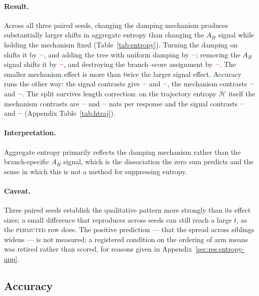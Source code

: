 \documentclass[11pt]{article}
\newcommand{\Htraj}{\mathcal{H}}
\newcommand{\AH}{A_{H}}
\providecommand{\PENDING}{\textcolor{red}{\textbf{--}}}
\newcommand{\num}[1]{\ifcsname #1\endcsname\csname #1\endcsname\else\PENDING\fi}
\begin{document}
\paragraph{Result.} Across all three paired seeds, changing the damping mechanism
produces substantially larger shifts in aggregate entropy than changing the $\AH$
signal while holding the mechanism fixed (Table~\ref{tab:entropy}). Turning the
damping on shifts it by $\num{Csteergrpoentropy}$, and adding the tree with uniform
damping by $\num{Cuniformsteerentropy}$; removing the $\AH$ signal shifts it by
$\num{Csigneduniformentropy}$, and destroying the branch--score assignment by
$\num{Csignedpermutedentropy}$. The smaller mechanism effect is more than twice the
larger signal effect. Accuracy runs the other way: the signal contrasts give
$\num{Csigneduniformacc}$ and $\num{Csignedpermutedacc}$, the mechanism contrasts
$\num{Csteergrpoacc}$ and $\num{Cuniformsteeracc}$. The split survives length
correction: on the trajectory entropy $\Htraj$ itself the mechanism contrasts are
$\num{Csteergrpohtraj}$ and $\num{Cuniformsteerhtraj}$ nats per response and the
signal contrasts $\num{Csigneduniformhtraj}$ and $\num{Csignedpermutedhtraj}$
(Appendix Table~\ref{tab:htraj}).

\paragraph{Interpretation.} Aggregate entropy primarily reflects the damping mechanism
rather than the branch-specific $\AH$ signal, which is the dissociation the zero sum
predicts and the sense in which this is not a method for suppressing entropy.

\paragraph{Caveat.} Three paired seeds establish the qualitative pattern more strongly
than its effect sizes; a small difference that reproduces across seeds can still reach
a large $t$, as the \textsc{permuted} row does. The positive prediction --- that the
spread across siblings widens --- is not measured; a registered condition on the ordering of arm means was
retired rather than scored, for reasons given in Appendix~\ref{sec:res:entropy-app}.

\subsection{Accuracy}
\label{sec:res:acc}
\end{document}
